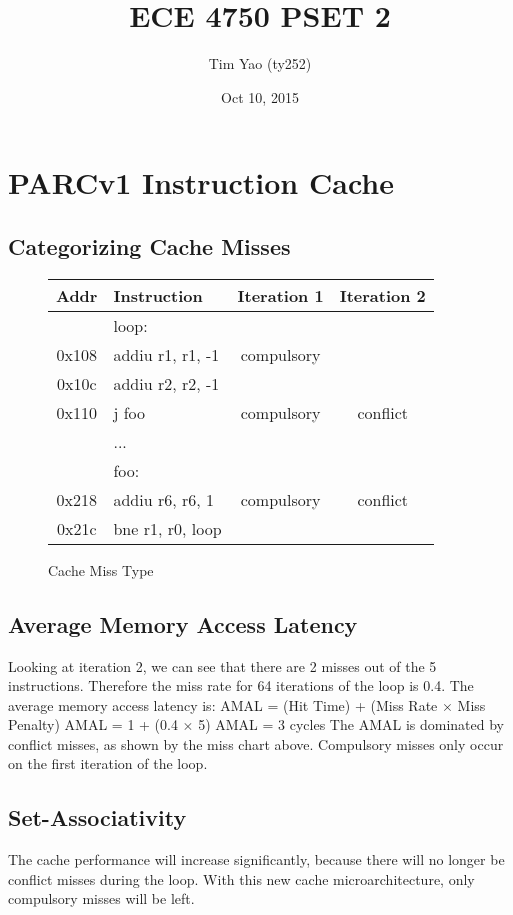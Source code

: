 \documentclass[10pt]{article}
\title{ECE 4750 PSET 2}
\author{Tim Yao (ty252)}
\date{Oct 10, 2015}
\begin{document}
\maketitle
\newcommand*{\tableindent}{\hspace*{0.3cm}}%

\section{PARCv1 Instruction Cache} 
\subsection{Categorizing Cache Misses}
\begin{figure}[H]
\centering
\begin{tabular}{clcc}
\hline
\textbf{Addr} &\textbf{Instruction}& \textbf{Iteration 1} & \textbf{Iteration 2}\\
\hline
& loop: & & \\
\hline
0x108 & \tableindent addiu r1, r1, -1 & compulsory & \\
\hline
0x10c & \tableindent addiu r2, r2, -1 & 		   & \\
\hline
0x110 & \tableindent j foo			  & compulsory & conflict \\
\hline
	  & ...							  & 		   & \\
\hline
	  & foo:						  & 		   & \\
\hline
0x218 & \tableindent addiu r6, r6, 1  & compulsory & conflict \\
\hline
0x21c & \tableindent bne r1, r0, loop & 	       & \\
\hline
\end{tabular}
\caption{Cache Miss Type}
\end{figure}

\subsection{Average Memory Access Latency}
Looking at iteration 2, we can see that there are 2 misses out of the 5 instructions. Therefore the miss rate for 64 iterations of the loop is 0.4.
The average memory access latency is:
AMAL = (Hit Time) + (Miss Rate $\times$ Miss Penalty)
AMAL = 1 + (0.4 $\times$ 5)
AMAL = 3 cycles
The AMAL is dominated by conflict misses, as shown by the miss chart above. Compulsory misses only occur on the first iteration of the loop.

\subsection{Set-Associativity}
The cache performance will increase significantly, because there will no longer be conflict misses during the loop. With this new cache microarchitecture, only compulsory misses will be left. 
\end{document}
